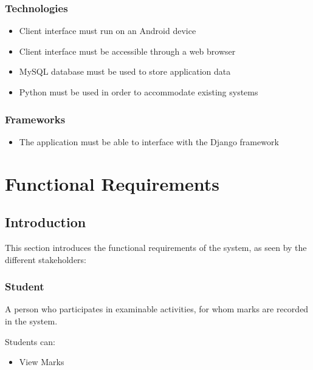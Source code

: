 \documentclass[a4paper]{article}
\begin{document}
			\subsubsection{Technologies}
		
				\begin{itemize}

					\item{Client interface must run on an Android device}

					\item{Client interface must be accessible through a web browser}
					
					\item{MySQL database must be used to store application data}
					
					\item{Python must be used in order to accommodate existing systems}

				\end{itemize}
				
			\subsubsection{Frameworks}
			
				\begin{itemize}

					\item{The application must be able to interface with the Django framework}

				\end{itemize}

	\section{Functional Requirements}

		\subsection{Introduction}

			This section introduces the functional requirements of the system, as seen by the different stakeholders:

			\subsubsection{Student}
				\begin{flushleft}
				A person who participates in examinable activities, for whom marks are recorded in the system. \linebreak 
				
				Students can:
				\end{flushleft}
				\begin{itemize}

					\item{View Marks}

				\end{itemize}
\end{document}
